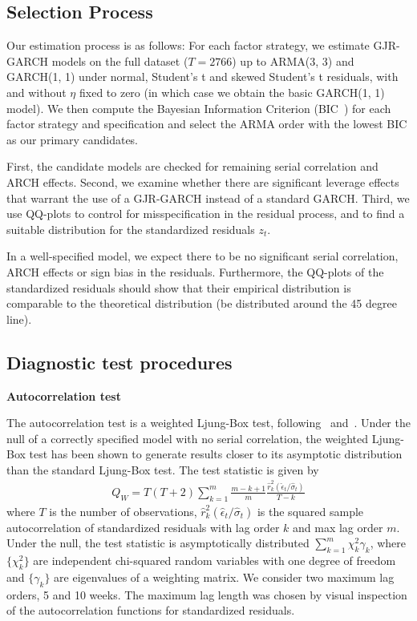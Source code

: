 
\subsection{Selection Process} %
\label{sub:selection_process}

Our estimation process is as follows: For each factor strategy, we estimate GJR-GARCH models on the full dataset ($T = 2766$) up to ARMA(3, 3) and GARCH(1, 1) under normal, Student's t and skewed Student's t residuals, with and without $\eta$ fixed to zero (in which case we obtain the basic GARCH(1, 1) model). We then compute the Bayesian Information Criterion (BIC~\autocite{Schwarz1978}) for each factor strategy and specification and select the ARMA order with the lowest BIC as our primary candidates.

First, the candidate models are checked for remaining serial correlation and ARCH effects. Second, we examine whether there are significant leverage effects that warrant the use of a GJR-GARCH instead of a standard GARCH. Third, we use QQ-plots to control for misspecification in the residual process, and to find a suitable distribution for the standardized residuals $z_t$.

In a well-specified model, we expect there to be no significant serial correlation, ARCH effects or sign bias in the residuals. Furthermore, the QQ-plots of the standardized residuals should show that their empirical distribution is comparable to the theoretical distribution (be distributed around the 45 degree line).


\subsection{Diagnostic test procedures}
\label{sub:diagnostic_test_procedures}

\textbf{Autocorrelation test}

The autocorrelation test is a weighted Ljung-Box test, following~\textcite{FisherGallagher2012} and~\textcite{LjungBox1978}. Under the null of a correctly specified model with no serial correlation, the weighted Ljung-Box test has been shown to generate results closer to its asymptotic distribution than the standard Ljung-Box test. The test statistic is given by
\begin{align}
	Q_W = T (T+2) \sum\limits^m_{k = 1} \frac{m-k+1}{m} \frac{\hat{r}_{k}^{2} (\hat{\epsilon}_{t} / \hat{\sigma}_{t})}{T-k}
\end{align}
where $T$ is the number of observations, $\hat{r}^{2}_{k} ( \hat{\epsilon}_{t} / \hat{\sigma}_{t} )$ is the squared sample autocorrelation of standardized residuals with lag order $k$ and max lag order $m$. Under the null, the test statistic is asymptotically distributed $\sum\limits^m_{k = 1} \chi^2_k \gamma_k$, where $\{\chi^2_k\}$ are independent chi-squared random variables with one degree of freedom and $\{\gamma_k\}$ are eigenvalues of a weighting matrix. We consider two maximum lag orders, 5 and 10 weeks. The maximum lag length was chosen by visual inspection of the autocorrelation functions for standardized residuals.

